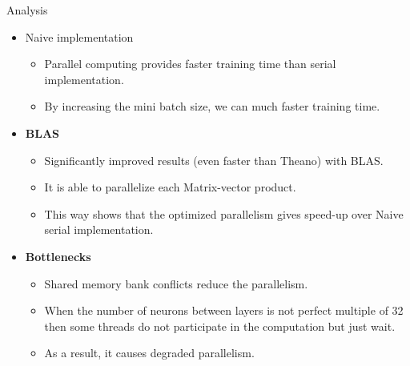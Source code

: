  
 \begin{frame}{Analysis}
 	\begin{itemize}
 	\item {Naive implementation}
 	\begin{itemize}
 	\item {Parallel computing provides faster training time than serial implementation.}
 	\item {By increasing the mini batch size, we can much faster training time.}
 	\end{itemize}
 	\item {\textbf{BLAS}}
 	\begin{itemize}
 	\item {Significantly improved results (even faster than Theano) with BLAS.}
 	\item {It is able to parallelize each Matrix-vector product.}
 	\item { This way shows that the optimized parallelism gives speed-up over Naive serial implementation.}
	\end{itemize}
	\item {\textbf{Bottlenecks}}
	\begin{itemize}
	\item {Shared memory bank conflicts reduce the parallelism.}
	\item {When the number of neurons between layers is not perfect multiple of 32 then some threads do not participate in the computation but just wait.}
	\item {As a result, it causes degraded parallelism.}
	\end{itemize}
 	\end{itemize}
 
 \end{frame}





